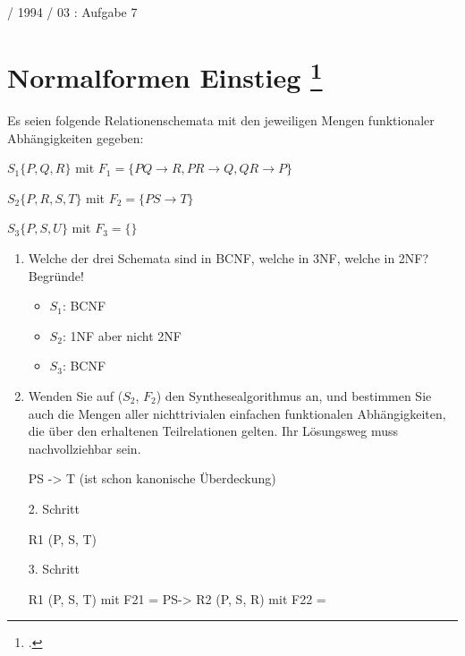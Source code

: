 \documentclass{lehramt-informatik-haupt}
\begin{document}
 / 1994 / 03 : Aufgabe 7

%

\section{Normalformen Einstieg
\footcite[Seite 1, Aufgabe 1: Normalformen Einstieg]{db:pu:4}
}

Es seien folgende Relationenschemata mit den jeweiligen Mengen
funktionaler Abhängigkeiten gegeben:

$S_1 \{P, Q, R\}$ mit
$F_1 = \{P Q \rightarrow R, P R \rightarrow Q, QR \rightarrow P \}$

$S_2 \{P, R, S, T \}$ mit
$F_2 = \{P S \rightarrow T \}$

$S_3 \{P, S, U \}$ mit
$F_3 = \{\}$

\begin{enumerate}


\item Welche der drei Schemata sind in BCNF, welche in 3NF, welche in
2NF? Begründe!

\begin{antwort}
\begin{itemize}
\item $S_1$: BCNF

\item $S_2$: 1NF aber nicht 2NF

\item $S_3$: BCNF
\end{itemize}
\end{antwort}


\item Wenden Sie auf ($S_2$, $F_2$) den Synthesealgorithmus an, und
bestimmen Sie auch die Mengen aller nichttrivialen einfachen
funktionalen Abhängigkeiten, die über den erhaltenen Teilrelationen
gelten. Ihr Lösungsweg muss nachvollziehbar sein.

\begin{antwort}
PS -> T (ist schon kanonische Überdeckung)

2. Schritt

R1 (P, S, T)

3. Schritt

R1 (P, S, T) mit F21 = {PS->}
R2 (P, S, R) mit F22 = {}

\end{antwort}

\end{enumerate}
\end{document}
